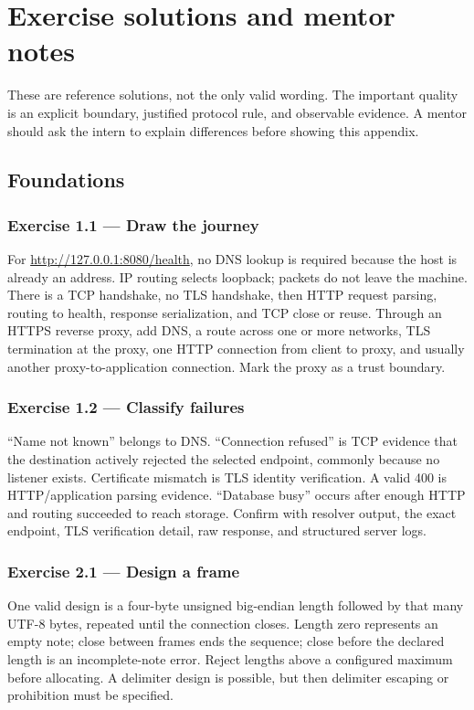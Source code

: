 \chapter{Exercise solutions and mentor notes}

These are reference solutions, not the only valid wording. The important quality
is an explicit boundary, justified protocol rule, and observable evidence. A
mentor should ask the intern to explain differences before showing this appendix.

\section{Foundations}

\subsection*{Exercise 1.1 --- Draw the journey}

For \url{http://127.0.0.1:8080/health}, no DNS lookup is required because the
host is already an address. IP routing selects loopback; packets do not leave the
machine. There is a TCP handshake, no TLS handshake, then HTTP request parsing,
routing to health, response serialization, and TCP close or reuse. Through an
HTTPS reverse proxy, add DNS, a route across one or more networks, TLS termination
at the proxy, one HTTP connection from client to proxy, and usually another
proxy-to-application connection. Mark the proxy as a trust boundary.

\subsection*{Exercise 1.2 --- Classify failures}

``Name not known'' belongs to DNS. ``Connection refused'' is TCP evidence that
the destination actively rejected the selected endpoint, commonly because no
listener exists. Certificate mismatch is TLS identity verification. A valid 400
is HTTP/application parsing evidence. ``Database busy'' occurs after enough HTTP
and routing succeeded to reach storage. Confirm with resolver output, the exact
endpoint, TLS verification detail, raw response, and structured server logs.

\subsection*{Exercise 2.1 --- Design a frame}

One valid design is a four-byte unsigned big-endian length followed by that many
UTF-8 bytes, repeated until the connection closes. Length zero represents an
empty note; close between frames ends the sequence; close before the declared
length is an incomplete-note error. Reject lengths above a configured maximum
before allocating. A delimiter design is possible, but then delimiter escaping
or prohibition must be specified.

